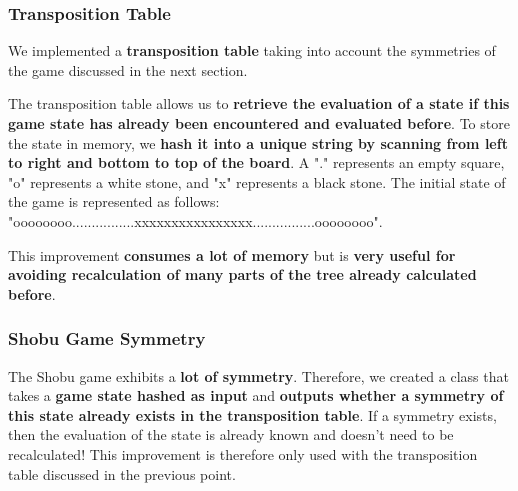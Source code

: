 \documentclass[11pt,a4paper]{report}
\begin{document}
\begin{answers}[23cm]
\subsubsection{Transposition Table}

We implemented a \textbf{transposition table} taking into account the symmetries of the game discussed in the next section.

The transposition table allows us to \textbf{retrieve the evaluation of a state if this game state has already been encountered and evaluated before}. To store the state in memory, we \textbf{hash it into a unique string by scanning from left to right and bottom to top of the board}. A "." represents an empty square, "o" represents a white stone, and "x" represents a black stone. The initial state of the game is represented as follows: "oooooooo................xxxxxxxxxxxxxxxx................oooooooo".

This improvement \textbf{consumes a lot of memory} but is \textbf{very useful for avoiding recalculation of many parts of the tree already calculated before}.

\subsubsection{Shobu Game Symmetry}

The Shobu game exhibits a \textbf{lot of symmetry}. Therefore, we created a class that takes a \textbf{game state hashed as input} and \textbf{outputs whether a symmetry of this state already exists in the transposition table}. If a symmetry exists, then the evaluation of the state is already known and doesn't need to be recalculated! This improvement is therefore only used with the transposition table discussed in the previous point.

\end{answers}
\end{document}
